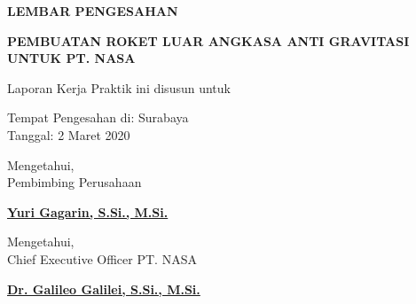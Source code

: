 \begin{center}
  {\Large \textbf{LEMBAR PENGESAHAN}}
  \vspace{6ex}


  {\large \textbf{PEMBUATAN ROKET LUAR ANGKASA ANTI GRAVITASI UNTUK PT. NASA}}
  \vspace{6ex}

  Laporan Kerja Praktik ini disusun untuk \lipsum[1][1]
  \vspace{2ex}

  Tempat Pengesahan di: Surabaya \\
  Tanggal: 2 Maret 2020
  \vspace{8ex}

  Mengetahui, \\
  Pembimbing Perusahaan
  \vspace{12ex}

  \textbf{\underline{Yuri Gagarin, S.Si., M.Si.}}
  \vspace{8ex}

  Mengetahui, \\
  Chief Executive Officer PT. NASA
  \vspace{12ex}

  \textbf{\underline{Dr. Galileo Galilei, S.Si., M.Si.}}

\end{center}
